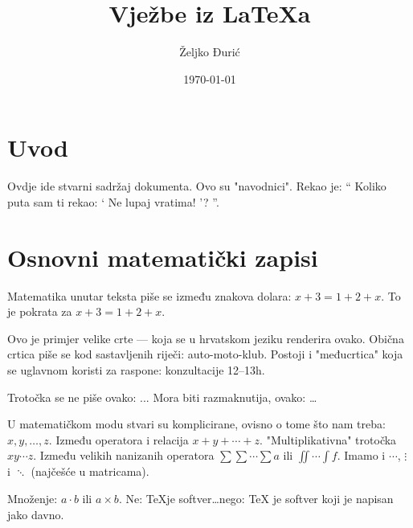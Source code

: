 \documentclass[12pt]{scrartcl}
\begin{document}
    \title{Vježbe iz \LaTeX a}
    \author{Željko Đurić}
    \date{\today}
    \maketitle
    \section{Uvod}
        Ovdje ide stvarni sadržaj dokumenta.
        Ovo su "navodnici".
        Rekao je:
        \enquote {
            Koliko puta sam ti rekao:
                \enquote {
                    Ne lupaj vratima!
                }?
        }.
    \section{Osnovni matematički zapisi}
        Matematika unutar teksta piše se između znakova dolara: $x + 3 = 1 + 2 + x$.
        To je pokrata za \(x + 3 = 1 + 2 + x\). %

        Ovo je primjer velike crte --- koja se u hrvatskom jeziku renderira ovako.
        Obična crtica piše se kod sastavljenih riječi: auto-moto-klub.
        Postoji i "međucrtica" koja se uglavnom koristi za raspone: konzultacije 12--13h.

        Trotočka se ne piše ovako: ... Mora biti razmaknutija, ovako: \ldots

        U matematičkom modu stvari su komplicirane, ovisno o tome što nam treba: $x,y,\dotsc,z$.
        Između operatora i relacija $x+y+\dotsb+z$.
        "Multiplikativna" trotočka $xy\dotsm z$.
        Između velikih nanizanih operatora $\sum\sum\dotsi\sum a$ ili $\iint\dotsi\int f$.
        Imamo i $\cdots$, $\vdots$ i $\ddots$ (najčešće u matricama).

        Množenje: $a\cdot b$ ili $a \times b$.
        Ne: \TeX je softver\ldots nego: \TeX{} je softver koji je napisan jako davno.
\end{document}
